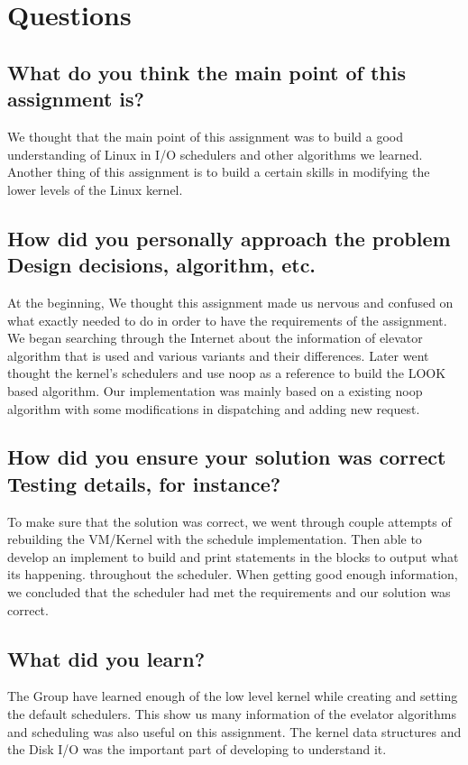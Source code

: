 \documentclass[onecolumn, draftclsnofoot, 10pt, titlepage, compsoc]{IEEEtran}
\begin{document}
\section{Questions}

\subsection{What do you think the main point of this assignment is?}

We thought that the main point of this assignment was to build a good understanding of Linux in I/O schedulers and other algorithms we learned. Another thing of this assignment is to build a certain skills in modifying the lower levels of the Linux kernel.\\

\subsection{How did you personally approach the problem Design decisions, algorithm, etc.}

At the beginning, We thought this assignment made us nervous and confused on what exactly needed to do in order to have the requirements of the assignment. We began searching through the Internet about the information of elevator algorithm that is used and various variants and their differences. Later went thought the kernel's schedulers and use noop as a reference to build the LOOK based algorithm. Our implementation was mainly based on a existing noop algorithm with some modifications in dispatching and adding new request.\\ 

\subsection{How did you ensure your solution was correct Testing details, for instance?}

To make sure that the solution was correct, we went through couple attempts of rebuilding the VM/Kernel with the schedule implementation. Then able to develop an implement to build and print statements in the blocks to output what its happening. throughout the scheduler. When getting good enough information, we concluded that the scheduler had met the requirements and our solution was correct. 

\subsection{What did you learn?}

The Group have learned enough of the low level kernel while creating and setting the default schedulers. This show us many information of the evelator algorithms and scheduling was also useful on this assignment. The kernel data structures and the Disk I/O was the important part of developing to understand it. 

\nocite{*}


\end{document}
